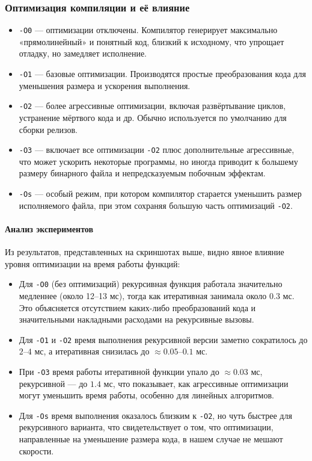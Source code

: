\subsubsection{Оптимизация компиляции и её влияние}

\begin{itemize}
    \item \texttt{-O0} — оптимизации отключены. Компилятор генерирует максимально «прямолинейный» и понятный код, близкий к исходному, что упрощает отладку, но замедляет исполнение.
    \item \texttt{-O1} — базовые оптимизации. Производятся простые преобразования кода для уменьшения размера и ускорения выполнения.
    \item \texttt{-O2} — более агрессивные оптимизации, включая развёртывание циклов, устранение мёртвого кода и др. Обычно используется по умолчанию для сборки релизов.
    \item \texttt{-O3} — включает все оптимизации \texttt{-O2} плюс дополнительные агрессивные, что может ускорить некоторые программы, но иногда приводит к большему размеру бинарного файла и непредсказуемым побочным эффектам.
    \item \texttt{-Os} — особый режим, при котором компилятор старается уменьшить размер исполняемого файла, при этом сохраняя большую часть оптимизаций \texttt{-O2}.
\end{itemize}

\paragraph*{Анализ экспериментов}

Из результатов, представленных на скриншотах выше, видно явное влияние уровня оптимизации на время работы функций:

\begin{itemize}
    \item Для \texttt{-O0} (без оптимизаций) рекурсивная функция работала значительно медленнее (около 12--13 мс), тогда как итеративная занимала около $0.3$ мс. Это объясняется отсутствием каких-либо преобразований кода и значительными накладными расходами на рекурсивные вызовы.
    
    \item Для \texttt{-O1} и \texttt{-O2} время выполнения рекурсивной версии заметно сократилось до $2$--$4$ мс, а итеративная снизилась до $\approx 0.05$--$0.1$ мс.
    
    \item При \texttt{-O3} время работы итеративной функции упало до $\approx 0.03$ мс, рекурсивной — до $1.4$ мс, что показывает, как агрессивные оптимизации могут уменьшить время работы, особенно для линейных алгоритмов.
    
    \item Для \texttt{-Os} время выполнения оказалось близким к \texttt{-O2}, но чуть быстрее для рекурсивного варианта, что свидетельствует о том, что оптимизации, направленные на уменьшение размера кода, в нашем случае не мешают скорости.
\end{itemize}

